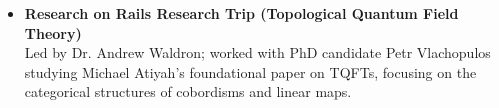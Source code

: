 \documentclass{curriculum-vitae}
\begin{document}
\begin{itemize}
  \item \textbf{Research on Rails Research Trip (Topological Quantum Field Theory)} \\
    Led by Dr. Andrew Waldron; worked with PhD candidate Petr Vlachopulos studying Michael Atiyah's foundational paper on TQFTs, focusing on the categorical structures of cobordisms and linear maps.


\end{itemize}
\end{document}
